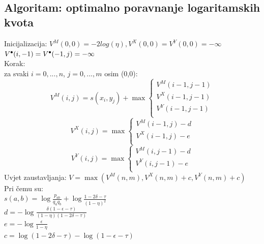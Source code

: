 \documentclass[a4paper]{article}
\newcommand\tab[1][1cm]{\hspace*{#1}}
\newcommand\sbullet[1][.5]{\mathbin{\vcenter{\hbox{\scalebox{#1}{$\bullet$}}}}}
\begin{document}
\noindent
\\
\subsection{Algoritam: optimalno poravnanje logaritamskih kvota \cite{hmm_algorithms}}  

Inicijalizacija: 
\tab \tab $V^M(0,0) = - 2 log(\eta), V^X(0,0) = V^Y(0,0) = -\infty$\\
\tab \tab $V^{\sbullet[.75]}(i,-1) = V^{\sbullet[.75]}(-1,j) = -\infty$\\
Korak:\\
\tab za svaki $i=0,...,n$, $j=0,...,m$ osim (0,0):\\
\begin{equation}
     V^M(i,j) = s(x_i,y_j) + \max
    \begin{cases}
      V^M(i-1,j-1)\\
      V^X(i-1,j-1)\\
      V^Y(i-1,j-1)\\          
    \end{cases}
\end{equation}
\begin{equation}
     V^X(i,j) = \max
    \begin{cases}
      V^M(i-1,j) - d\\
      V^X(i-1,j) - e\\
    \end{cases}   
\end{equation}
\begin{equation}
     V^Y(i,j) = \max
    \begin{cases}
      V^M(i,j-1) -d\\
      V^Y(i,j-1) - e\\         
    \end{cases}
\end{equation}
Uvjet zaustavljanja:
$V = \max(V^M(n,m), V^X(n,m) + c , V^Y(n,m) + c )$ \\
Pri čemu su:\\
	\tab$s(a,b) = \log\frac{p_{ab}}{q_a q_b} + \log\frac{1 - 2\delta - \tau }{(1-\eta)^2}$\\
    \tab$d = -\log\frac{\delta(1-\epsilon - \tau)}{(1-\eta)(1-2\delta - \tau)}$\\
    \tab$e = -\log\frac{\epsilon}{1-\eta}$\\
	\tab$c = \log( 1 - 2\delta - \tau) - \log(1-\epsilon - \tau)$
	
	
	
\end{document}
